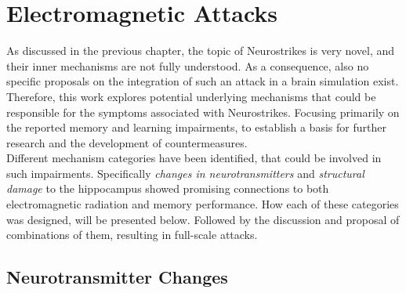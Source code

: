  
\section{Electromagnetic Attacks}
    As discussed in the previous chapter, the topic of Neurostrikes is very novel, and their inner mechanisms are not fully understood. As a consequence, also no specific proposals on the integration of such an attack in a brain simulation exist. Therefore, this work explores potential underlying mechanisms that could be responsible for the symptoms associated with Neurostrikes. Focusing primarily on the reported memory and learning impairments, to establish a basis for further research and the development of countermeasures.\\
    Different mechanism categories have been identified, that could be involved in such impairments. Specifically \textit{changes in neurotransmitters} and \textit{structural damage} to the hippocampus showed promising connections to both electromagnetic radiation and memory performance. How each of these categories was designed, will be presented below. Followed by the discussion and proposal of combinations of them, resulting in full-scale attacks. 


    \subsection{Neurotransmitter Changes}
    
